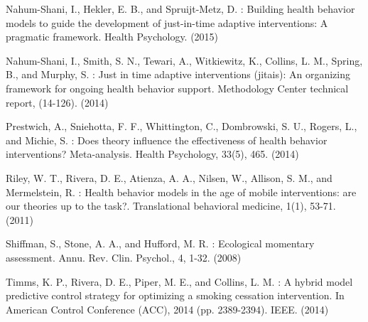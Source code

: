 \documentclass[runningheads,a4paper]{llncs}
\begin{document}
\begin{thebibliography}{4}

 Nahum-Shani, I., Hekler, E. B., and Spruijt-Metz, D. : Building health behavior models to guide the development of just-in-time adaptive interventions: A pragmatic framework. Health Psychology. (2015)

 Nahum-Shani, I., Smith, S. N., Tewari, A., Witkiewitz, K., Collins, L. M., Spring, B., and Murphy, S. : Just in time adaptive interventions (jitais): An organizing framework for ongoing health behavior support. Methodology Center technical report, (14-126). (2014)

 Prestwich, A., Sniehotta, F. F., Whittington, C., Dombrowski, S. U., Rogers, L., and Michie, S. : Does theory influence the effectiveness of health behavior interventions? Meta-analysis. Health Psychology, 33(5), 465. (2014)

 Riley, W. T., Rivera, D. E., Atienza, A. A., Nilsen, W., Allison, S. M., and Mermelstein, R. : Health behavior models in the age of mobile interventions: are our theories up to the task?. Translational behavioral medicine, 1(1), 53-71. (2011)

 Shiffman, S., Stone, A. A., and Hufford, M. R. : Ecological momentary assessment. Annu. Rev. Clin. Psychol., 4, 1-32. (2008)

 Timms, K. P., Rivera, D. E., Piper, M. E., and Collins, L. M. : A hybrid model predictive control strategy for optimizing a smoking cessation intervention. In American Control Conference (ACC), 2014 (pp. 2389-2394). IEEE. (2014)







\end{thebibliography}
\end{document}
